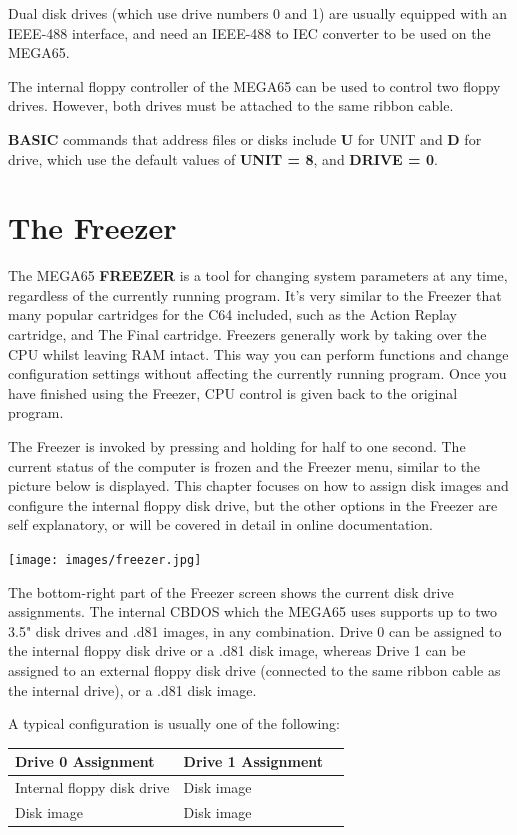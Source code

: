 Dual disk drives (which use drive numbers 0 and 1) are usually equipped with an IEEE-488 interface, and need
an IEEE-488 to IEC converter to be used on the MEGA65.

The internal floppy controller of the MEGA65 can be used to control
two floppy drives. However, both drives must be attached to the same ribbon cable.

{\bf BASIC} commands that address files or disks include
{\bf U} for UNIT and {\bf D} for drive, which use the default values of
{\bf UNIT = 8}, and {\bf DRIVE = 0}.

\section{The Freezer}
\label{sec:freezer}
The MEGA65 {\bf FREEZER} is a tool for changing system parameters at any time,
regardless of the currently running program. It's very similar to the Freezer that many popular cartridges
for the C64 included, such as the Action Replay cartridge, and The Final cartridge. Freezers generally work by
taking over the CPU whilst leaving RAM intact. This way you can perform functions and change configuration
settings without affecting the currently running program. Once you have finished using the Freezer, CPU control
is given back to the original program.


The Freezer is invoked by pressing and holding  for half to one second.
The current status of the computer is frozen and the Freezer menu,
similar to the picture below is displayed. This chapter focuses on how to assign disk images and configure
the internal floppy disk drive, but the other options in the Freezer are self explanatory, or will be covered in detail in
online documentation.

\begin{center}
\texttt{[image: images/freezer.jpg]}
\end{center}

The bottom-right part of the Freezer screen shows the current disk drive assignments.
The internal CBDOS which the MEGA65 uses supports up to two
3.5" disk drives and .d81 images, in any combination.
Drive 0 can be assigned to the internal floppy disk drive or a .d81 disk image,
whereas Drive 1 can be assigned to an external floppy disk drive (connected to the
same ribbon cable as the internal drive), or a .d81 disk image.

A typical configuration is usually one of the following:
\begin{center}
\begin{tabular}{|l|l|l|}
\hline
{\bf Drive 0 Assignment} & {\bf Drive 1 Assignment} \\
\hline
Internal floppy disk drive &  Disk image \\
Disk image                 &  Disk image \\
\hline
\end{tabular}
\end{center}

